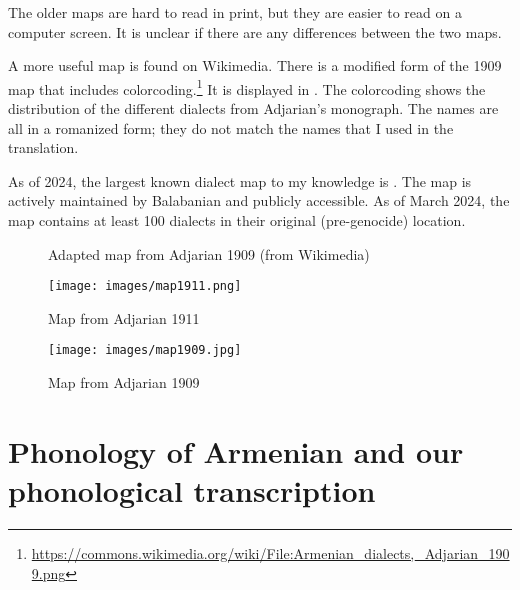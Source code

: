 \documentclass[output=paper]{langscibook}
\begin{document}
The older maps are hard to read in print, but they are easier to read on a computer screen. It is unclear if there are any differences between the two maps.

A more useful map is found on Wikimedia. There is a modified form of the 1909 map that includes colorcoding.\footnote{\url{https://commons.wikimedia.org/wiki/File:Armenian_dialects,_Adjarian_1909.png}} It   is displayed in . The colorcoding shows the distribution of the different dialects from Adjarian's monograph. The names are all in a romanized form; they do not   match the names that I used in the translation. 


As of 2024, the largest known dialect map to my knowledge is \citet{Balabanian-2024-ArmenainDialectMap}. The map is actively maintained by Balabanian and publicly accessible. As of March 2024, the map contains at least 100 dialects in their original (pre-genocide) location.


\begin{figure} 
	\caption{Adapted map from Adjarian 1909 (from Wikimedia)}
	\label{map:Adjarian1909color}
\end{figure}


\begin{landscape}
	\begin{figure} 
		\caption{Map from Adjarian 1911}
	\label{map:Adjarian1911}
		\texttt{[image: images/map1911.png]}
	
	\end{figure}
\end{landscape}

\begin{landscape}
	\begin{figure}
	\caption{Map from Adjarian 1909}
\label{map:Adjarian1909}
		\texttt{[image: images/map1909.jpg]}
		
	\end{figure}
\end{landscape}


  
 \section{Phonology of Armenian and our phonological transcription}\label{sec:HossepIntro:phonotransc}
\end{document}
